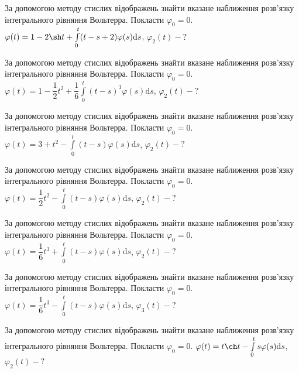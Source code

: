 \documentclass[12pt]{extarticle}
\begin{document}
\begin{Exercise}
За допомогою методу стислих відображень знайти вказане наближення розв’язку інтегрального рівняння Вольтерра. Покласти $\varphi_0=0$. $\varphi(t) = 1 - 2\sh t + \int\limits_{0}^{t} (t-s+2)\varphi(s) \mathrm{d}s$, $\varphi_2(t) - ?$
\end{Exercise}

\begin{Exercise}
За допомогою методу стислих відображень знайти вказане наближення розв’язку інтегрального рівняння Вольтерра. Покласти $\varphi_0=0$. $\varphi(t) = 1 - \dfrac{1}{2}t^2 + \dfrac{1}{6}\int\limits_{0}^{t} (t-s)^3 \varphi(s) \mathrm{d}s$, $\varphi_2(t) - ?$
\end{Exercise}

\begin{Exercise}
За допомогою методу стислих відображень знайти вказане наближення розв’язку інтегрального рівняння Вольтерра. Покласти $\varphi_0=0$. $\varphi(t) = 3 + t^2 - \int\limits_{0}^{t} (t-s)\varphi(s) \mathrm{d}s$, $\varphi_2(t) - ?$
\end{Exercise}

\begin{Exercise}
За допомогою методу стислих відображень знайти вказане наближення розв’язку інтегрального рівняння Вольтерра. Покласти $\varphi_0=0$. $\varphi(t) = \dfrac{1}{2}t^2 - \int\limits_{0}^{t} (t-s)\varphi(s) \mathrm{d}s$, $\varphi_2(t) - ?$
\end{Exercise}

\begin{Exercise}
За допомогою методу стислих відображень знайти вказане наближення розв’язку інтегрального рівняння Вольтерра. Покласти $\varphi_0=0$. $\varphi(t) = \dfrac{1}{6}t^3 + \int\limits_{0}^{t} (t-s) \varphi(s) \mathrm{d}s$, $\varphi_2(t) - ?$
\end{Exercise}

\begin{Exercise}
За допомогою методу стислих відображень знайти вказане наближення розв’язку інтегрального рівняння Вольтерра. Покласти $\varphi_0=0$. $\varphi(t) = \dfrac{1}{6}t^3 - \int\limits_{0}^{t} (t-s) \varphi(s) \mathrm{d}s$, $\varphi_3(t) - ?$
\end{Exercise}

\begin{Exercise}
За допомогою методу стислих відображень знайти вказане наближення розв’язку інтегрального рівняння Вольтерра. Покласти $\varphi_0=0$. $\varphi(t) = t \ch t - \int\limits_{0}^{t} s\varphi(s) \mathrm{d}s$, $\varphi_2(t) - ?$
\end{Exercise}
\end{document}
